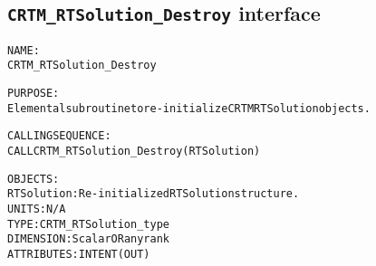 \subsection{\texttt{CRTM\_RTSolution\_Destroy} interface}
  \label{sec:CRTM_RTSolution_Destroy_interface}
  \begin{alltt}
 
  NAME:
        CRTM_RTSolution_Destroy
  
  PURPOSE:
        Elemental subroutine to re-initialize CRTM RTSolution objects.
 
  CALLING SEQUENCE:
        CALL CRTM_RTSolution_Destroy( RTSolution )
 
  OBJECTS:
        RTSolution:   Re-initialized RTSolution structure.
                      UNITS:      N/A
                      TYPE:       CRTM_RTSolution_type
                      DIMENSION:  Scalar OR any rank
                      ATTRIBUTES: INTENT(OUT)
 
  \end{alltt}
